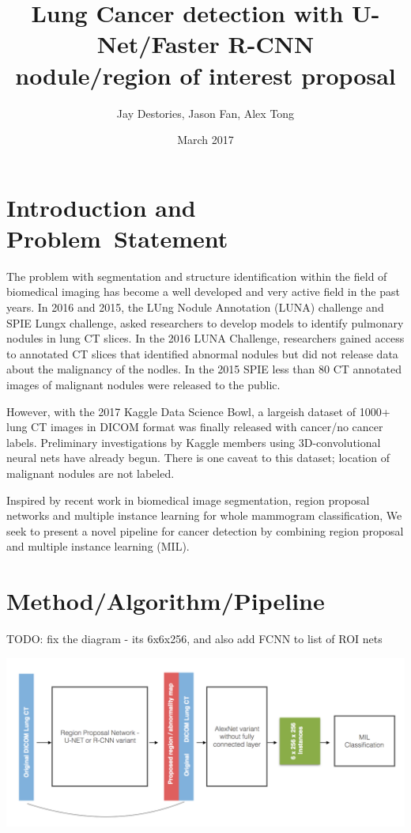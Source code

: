 \documentclass[twocolumn,10pt]{article}
\title{Lung Cancer detection with U-Net/Faster R-CNN \\
nodule/region of interest proposal}
\author{Jay Destories, Jason Fan, Alex Tong}
\date{March 2017}
\newcommand{\red}[1]{{\color{red}#1}}
\newcommand{\temp}[1]{{\red{#1}\\}}
\begin{document}
\maketitle
\section{Introduction and \\Problem~Statement}
The problem with segmentation and structure identification within the field of 
biomedical imaging has become a well developed and very active field in the past
years. In 2016 and 2015, the LUng Nodule Annotation (LUNA) challenge and 
SPIE Lungx challenge, asked researchers to develop models to identify pulmonary 
nodules in lung CT slices. In the 2016 LUNA Challenge, researchers gained access
to annotated CT slices that identified abnormal nodules but did not release data
about the malignancy of the nodles. In the 2015 SPIE less than 80 CT annotated 
images of malignant nodules were released to the public.

However, with the 2017 Kaggle Data Science Bowl, a large\red{ish} dataset of
1000+ lung CT images in DICOM format was finally released with cancer/no cancer 
labels. Preliminary investigations by Kaggle members
using 3D-convolutional neural nets have already begun. There is one caveat to this 
dataset; location of malignant nodules are not labeled. 

Inspired by recent work in biomedical image segmentation, region proposal 
networks and multiple instance learning for whole mammogram classification,
We seek to present a novel pipeline for cancer detection by combining
region proposal and multiple instance learning (MIL).

\section{Method/Algorithm/Pipeline}

\temp{TODO: fix the diagram - its 6x6x256, and also add FCNN to list of ROI nets}

\includegraphics[width=\columnwidth]{img/architecture.png}
\end{document}

